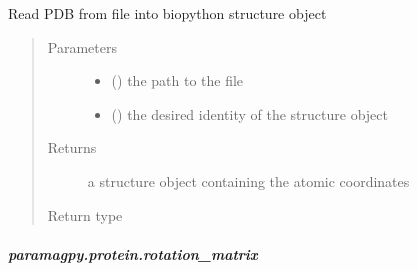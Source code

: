 \documentclass[a4paper,10pt,english,openany,oneside]{sphinxmanual}
\begin{document}
\begin{fulllineitems}
\label{\detokenize{reference/generated/paramagpy.protein.load_pdb:paramagpy.protein.load_pdb}}
Read PDB from file into biopython structure object
\begin{quote}\begin{description}
\item[{Parameters}] \leavevmode\begin{itemize}
\item {} 
 () \textendash{} the path to the file

\item {} 
 (\sphinxstyleliteralemphasis{\sphinxupquote{ (}}\sphinxstyleliteralemphasis{\sphinxupquote{)}}) \textendash{} the desired identity of the structure object

\end{itemize}

\item[{Returns}] \leavevmode
{} \textendash{} a structure object containing the atomic coordinates

\item[{Return type}] \leavevmode
{\hyperref[\detokenize{reference/generated/paramagpy.protein.CustomStructure:paramagpy.protein.CustomStructure}]{}}

\end{description}\end{quote}

\end{fulllineitems}



\subparagraph{paramagpy.protein.rotation\_matrix}
\label{\detokenize{reference/generated/paramagpy.protein.rotation_matrix:paramagpy-protein-rotation-matrix}}\label{\detokenize{reference/generated/paramagpy.protein.rotation_matrix::doc}}
\end{document}
